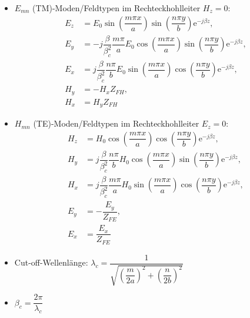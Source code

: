 \begin{itemize}
    \itemsep0pt
    \item \(E_{mn}\) (TM)-Moden/Feldtypen im Rechteckhohlleiter \(H_z = 0\):
        \begin{align*}
            E_z &= E_0 \sin\left(\dfrac{m\pi x}{a}\right)\sin\left(\dfrac{n\pi y}{b}\right)\mathrm{e}^{-j\beta z},\\
            E_y &= -j\dfrac{\beta}{\beta_c^2} \dfrac{m\pi}{a}  E_0\cos\left(\dfrac{m\pi x}{a}\right)\sin\left(\dfrac{n\pi y}{b}\right)\mathrm{e}^{-j\beta z},\\
            E_x &= j\dfrac{\beta}{\beta_c^2} \dfrac{n\pi}{b} E_0 \sin\left(\dfrac{m\pi x}{a}\right)\cos\left(\dfrac{n\pi y}{b}\right)\mathrm{e}^{-j\beta z},\\
            H_y &= -H_x Z_{FH},\\
            H_x &= H_y Z_{FH}
        \end{align*}
    \item \(H_{mn}\) (TE)-Moden/Feldtypen im Rechteckhohlleiter \(E_z = 0\):
        \begin{align*}
            H_z &= H_0 \cos\left(\dfrac{m\pi x}{a}\right)\cos\left(\dfrac{n\pi y}{b}\right)\mathrm{e}^{-j\beta z},\\
            H_y &= j\dfrac{\beta}{\beta_c^2} \dfrac{n\pi}{b}  H_0 \cos\left(\dfrac{m\pi x}{a}\right)\sin\left(\dfrac{n\pi y}{b}\right)\mathrm{e}^{-j\beta z},\\
            H_x &= j\dfrac{\beta}{\beta_c^2} \dfrac{m\pi}{a} H_0 \sin\left(\dfrac{m\pi x}{a}\right)\cos\left(\dfrac{n\pi y}{b}\right)\mathrm{e}^{-j\beta z},\\
            E_y &= -\dfrac{E_y}{Z_{FE}},\\
            E_x &= \dfrac{E_x}{Z_{FE}}
        \end{align*}
    \item Cut-off-Wellenlänge: \(\lambda_c = \dfrac{1}{\sqrt{ \left(\dfrac{m}{2a}\right)^2 + \left(\dfrac{n}{2b}\right)^2 }}\)
    \item \(\beta_c = \dfrac{2\pi}{\lambda_c}\)
\end{itemize}
